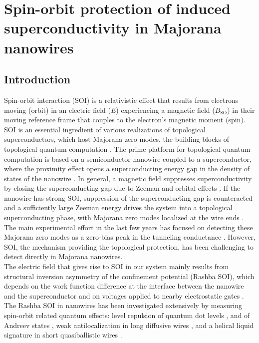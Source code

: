 \chapter{Spin-orbit protection of induced superconductivity in Majorana nanowires}
\label{ch:spinorbit}

\newpage
\noindent 
\section{Introduction}

Spin-orbit interaction (SOI) is a relativistic effect that results from electrons moving (orbit) in an electric field ($E$) experiencing a magnetic field ($B_{\mathrm{SO}}$) in their moving reference frame that couples to the electron's magnetic moment (spin). SOI is an essential ingredient of various realizations of topological superconductors, which host Majorana zero modes, the building blocks of topological quantum computation \cite{Kitaev2001,Fu2008,Nayak2008}. The prime platform for topological quantum computation is based on a semiconductor nanowire coupled to a superconductor, where the proximity effect opens a superconducting energy gap in the density of states of the nanowire \cite{Lutchyn2010,Oreg2010}. In general, a magnetic field suppresses superconductivity by closing the superconducting gap due to Zeeman and orbital effects \cite{Nijholt2016}. If the nanowire has strong SOI, suppression of the superconducting gap is counteracted and a sufficiently large Zeeman energy drives the system into a topological superconducting phase, with Majorana zero modes localized at the wire ends \cite{Lutchyn2010,Oreg2010}. The main experimental effort in the last few years has focused on detecting these Majorana zero modes as a zero-bias peak in the tunneling conductance \cite{Mourik2012,Albrecht2016,Deng2016,BalMaj,QZBP,LutchynReview,AguadoReview}. However, SOI, the mechanism providing the topological protection, has been challenging to detect directly in Majorana nanowires. 
\\ \indent
The electric field that gives rise to SOI in our system mainly results from structural inversion asymmetry of the confinement potential (Rashba SOI), which depends on the work function difference at the interface between the nanowire and the superconductor and on voltages applied to nearby electrostatic gates \cite{Vuik2016,Antipov2018,Woods2018,Mikkelsen2018}. The Rashba SOI in nanowires has been investigated extensively by measuring spin-orbit related quantum effects: level repulsion of quantum dot levels \cite{Fasth2007,NadjPerge2012}, and of Andreev states \cite{DeMoor2018,Deng2016}, weak antilocalization in long \mbox{diffusive} wires \cite{Hansen2005,VanWeperen2015}, and a helical liquid signature in short quasiballistic wires \cite{JakobHelical}.
